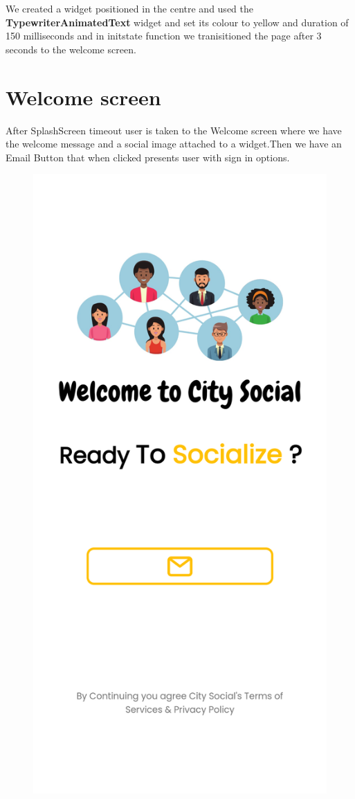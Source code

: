 We created a widget positioned in the centre and used the \textbf{TypewriterAnimatedText} widget and set its colour to yellow and duration of 150 milliseconds and in initstate function we tranisitioned the page after 3 seconds to the welcome screen.

\section{Welcome screen}
After SplashScreen timeout user is taken to the Welcome screen where we have the welcome message and a social image attached to a widget.Then we have an Email Button that when clicked presents user with sign in options.

\begin{figure}[H]
    \centering
    \includegraphics[scale=0.15]{App Screenshots/WelcomePage.png}

\end{figure}
